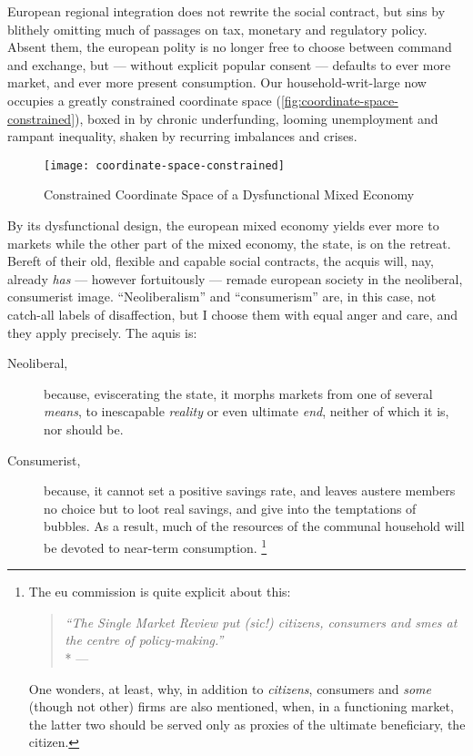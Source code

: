 European regional integration does not rewrite the social contract, but sins by blithely omitting much of passages on tax, monetary and regulatory policy.
Absent them, the european polity is no longer free to choose between %
command and exchange, but --- without explicit popular consent --- defaults to ever more market, and ever more present consumption.
Our household-writ-large now occupies a greatly constrained coordinate space (\autoref{fig:coordinate-space-constrained}), boxed in by chronic underfunding,  looming unemployment and rampant inequality, shaken by recurring imbalances and crises.

\begin{figure}[htbp]
	\begin{center}
	\texttt{[image: coordinate-space-constrained]}
	\caption{Constrained Coordinate Space of a Dysfunctional Mixed Economy}
	\label{fig:coordinate-space-constrained}
	\end{center}
\end{figure}

By its dysfunctional design, the european mixed economy yields ever more to markets while the other part of the mixed economy, the state, is on the retreat.
Bereft of their old, flexible and capable social contracts, the acquis will, nay, already \emph{has} --- however fortuitously --- remade european society in the neoliberal, consumerist image.
``Neoliberalism'' and ``consumerism'' are, in this case, not catch-all labels of disaffection, but I choose them with equal anger and care, and they apply precisely.
The aquis is:

\begin{description}
	\item[Neoliberal,]
	because, eviscerating the state, it morphs markets from one of several \emph{means}, to inescapable \emph{reality} or even ultimate \emph{end}, neither of which it is, nor should be.

	\item[Consumerist,]
	because, it cannot set a positive savings rate, and leaves austere members no choice but to loot real savings, and give into the temptations of bubbles.
	As a result, much of the resources of the communal household will be devoted to near-term consumption.
	\footnote{
		The \gls{eu} commission is quite explicit about this:

			\begin{quote}
				\emph{``The Single Market Review put \emph{(sic!)} citizens, consumers and \glspl{sme} at the centre of policy-making.''}
				\\*
				--- \citet[3]{Commission2008}
			\end{quote}

		One wonders, at least, why, in addition to \emph{citizens}, consumers and \emph{some} (though not other) firms are also mentioned, when, in a functioning market, the latter two should be served only as proxies of the ultimate beneficiary, the citizen.
	}
\end{description}

